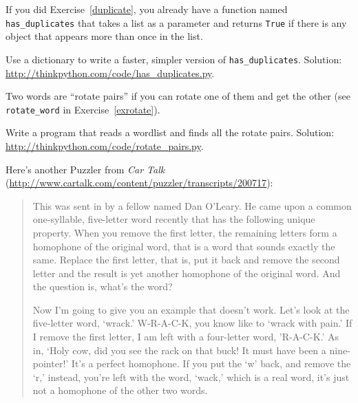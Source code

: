 \documentclass[10pt]{book}
\begin{document}
\begin{CJK}{UTF8}{gbsn}
\begin{exercise}

If you did Exercise~\ref{duplicate}, you already have
a function named \verb"has_duplicates" that takes a list
as a parameter and returns {\tt True} if there is any object
that appears more than once in the list.

Use a dictionary to write a faster, simpler version of
\verb"has_duplicates". 
Solution: \url{http://thinkpython.com/code/has_duplicates.py}.

\end{exercise}


\begin{exercise}
\label{exrotatepairs}

Two words are ``rotate pairs'' if you can rotate one of them
and get the other (see \verb"rotate_word" in Exercise~\ref{exrotate}).

Write a program that reads a wordlist and finds all the rotate
pairs.  Solution: \url{http://thinkpython.com/code/rotate_pairs.py}.

\end{exercise}


\begin{exercise}

Here's another Puzzler from {\em Car
Talk} (\url{http://www.cartalk.com/content/puzzler/transcripts/200717}):

\begin{quote}
This was sent in by a fellow named Dan O'Leary. He came upon a common
one-syllable, five-letter word recently that has the following unique
property. When you remove the first letter, the remaining letters form
a homophone of the original word, that is a word that sounds exactly
the same. Replace the first letter, that is, put it back and remove
the second letter and the result is yet another homophone of the
original word. And the question is, what's the word?

Now I'm going to give you an example that doesn't work. Let's look at
the five-letter word, `wrack.' W-R-A-C-K, you know like to `wrack with
pain.' If I remove the first letter, I am left with a four-letter
word, 'R-A-C-K.' As in, `Holy cow, did you see the rack on that buck!
It must have been a nine-pointer!' It's a perfect homophone. If you
put the `w' back, and remove the `r,' instead, you're left with the
word, `wack,' which is a real word, it's just not a homophone of the
other two words.


\end{quote}
\end{exercise}
\end{CJK}
\end{document}
